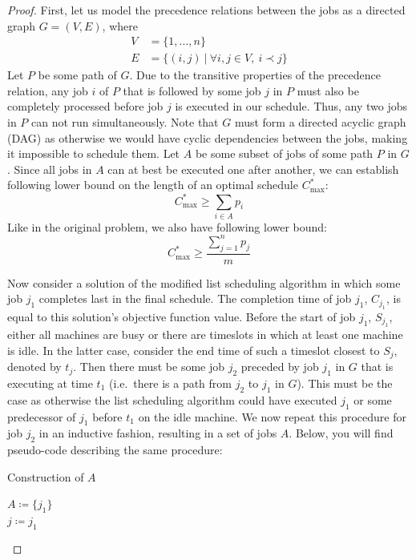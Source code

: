 \documentclass{article}
\begin{document}
\begin{proof}
    First, let us model the precedence relations between the jobs as a directed graph $G=(V,E)$, where
    \begin{align*}
        V &= \{1,\dots,n\}\\
        E &= \{(i,j)\ |\ \forall i,j \in V,\ i \prec j\}
    \end{align*}
    Let $P$ be some path of $G$. Due to the transitive properties of the precedence relation, any job $i$ of $P$ that is followed by some job $j$ in $P$ must also be completely processed before job $j$ is executed in our schedule. Thus, any two jobs in $P$ can not run simultaneously. Note that $G$ must form a directed acyclic graph (DAG) as otherwise we would have cyclic dependencies between the jobs, making it impossible to schedule them. Let $A$ be some subset of jobs of some path $P$ in $G$. Since all jobs in $A$ can at best be executed one after another, we can establish following lower bound on the length of an optimal schedule $C^*_{\max}$:
    \[
        C^*_{\max} \ge \sum_{i \in A} p_{i}
    \]
    Like in the original problem, we also have following lower bound:
    \[
        C^*_{\max} \ge \frac{\sum^n_{j=1}p_j}{m}
    \]

    Now consider a solution of the modified list scheduling algorithm in which some job $j_1$ completes last in the final schedule. The completion time of job $j_1$, $C_{j_1}$, is equal to this solution's objective function value. Before the start of job $j_1$, $S_{j_1}$, either all machines are busy or there are timeslots in which at least one machine is idle. In the latter case, consider the end time of such a timeslot closest to $S_j$, denoted by $t_j$. Then there must be some job $j_2$ preceded by job $j_1$ in $G$ that is executing at time $t_1$ (i.e.~there is a path from $j_2$ to $j_1$ in $G$). This must be the case as otherwise the list scheduling algorithm could have executed $j_1$ or some predecessor of $j_1$ before $t_1$ on the idle machine. We now repeat this procedure for job $j_2$ in an inductive fashion, resulting in a set of jobs $A$. Below, you will find pseudo-code describing the same procedure:

    \begin{algorithm}
        \caption{Construction of $A$}
        \label{alg:1}
        $A \coloneqq \{j_1\}$\\
        $j \coloneqq j_1$\\
    \end{algorithm}


\end{proof}
\end{document}
